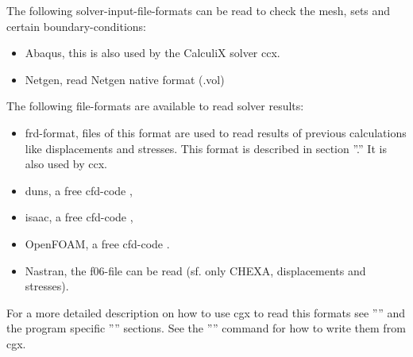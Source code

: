 \documentclass{article}
\begin{document}
The following solver-input-file-formats can be read to check the mesh, sets and certain boundary-conditions:
\begin{itemize}
\item Abaqus, this is also used by the CalculiX solver ccx.
\item Netgen, read Netgen native format (.vol)
\end{itemize}
The following file-formats are available to read solver results:
\begin{itemize}
\item frd-format, files of this format are used to read results of previous calculations like displacements and stresses. This format is described in section ''.'' It is also used by ccx. 
\item duns, a free cfd-code \cite{duns},
\item isaac, a free cfd-code \cite{isaac},
\item OpenFOAM, a free cfd-code \cite{OpenFOAM}.
\item Nastran, the f06-file can be read (sf. only CHEXA, displacements and stresses).
\end{itemize}
For a more detailed description on how to use cgx to read this formats see '''' and the program specific '''' sections.  See the '''' command for how to write them from cgx.
\end{document}
